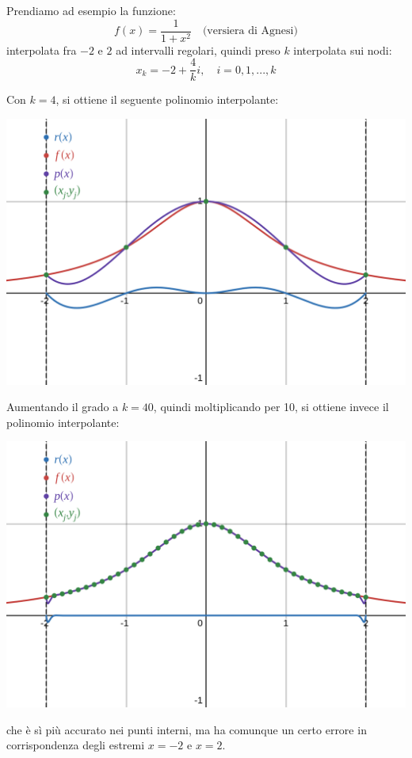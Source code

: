 \documentclass[a4paper,11pt]{article}
\begin{document}
Prendiamo ad esempio la funzione:
$$
f(x) = \frac{1}{1 + x^2} \quad \text{(versiera di Agnesi)}
$$
interpolata fra $-2$ e $2$ ad intervalli regolari, quindi preso $k$ interpolata sui nodi:
$$
x_k = -2 + \frac{4}{k}i, \quad i = 0, 1, ..., k
$$

Con $k = 4$, si ottiene il seguente polinomio interpolante:
\begin{center}
	\includegraphics[scale=0.28]{../figures/runge_k4.png}
\end{center}

Aumentando il grado a $k = 40$, quindi moltiplicando per 10, si ottiene invece il polinomio interpolante:
\begin{center}
	\includegraphics[scale=0.28]{../figures/runge_k40.png}
\end{center}
che è sì più accurato nei punti interni, ma ha comunque un certo errore in corrispondenza degli estremi $x = -2$ e $x = 2$.
\end{document}
